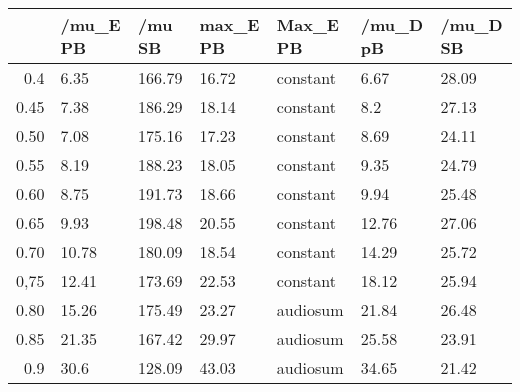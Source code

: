 \begin{table}[ht]
\centering
\begin{tabular}{rllllll}
  \hline
 & /mu\_E PB & /mu SB & max\_E PB & Max\_E PB & /mu\_D pB & /mu\_D SB \\ 
  \hline
0.4 & 6.35 & 166.79 & 16.72 & constant & 6.67 & 28.09 \\ 
  0.45 & 7.38 & 186.29 & 18.14 & constant & 8.2 & 27.13 \\ 
  0.50 & 7.08 & 175.16 & 17.23 & constant & 8.69 & 24.11 \\ 
  0.55 & 8.19 & 188.23 & 18.05 & constant & 9.35 & 24.79 \\ 
  0.60 & 8.75 & 191.73 & 18.66 & constant & 9.94 & 25.48 \\ 
  0.65 & 9.93 & 198.48 & 20.55 & constant & 12.76 & 27.06 \\ 
  0.70 & 10.78 & 180.09 & 18.54 & constant & 14.29 & 25.72 \\ 
  0,75 & 12.41 & 173.69 & 22.53 & constant & 18.12 & 25.94 \\ 
  0.80 & 15.26 & 175.49 & 23.27 & audiosum & 21.84 & 26.48 \\ 
  0.85 & 21.35 & 167.42 & 29.97 & audiosum & 25.58 & 23.91 \\ 
  0.9 & 30.6 & 128.09 & 43.03 & audiosum & 34.65 & 21.42 \\ 
   \hline
\end{tabular}
\end{table}
